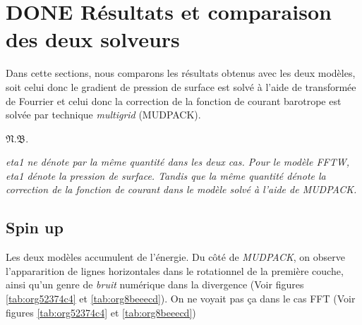 \documentclass[10pt]{article}
\numberwithin{equation}{section}
\newcommand{\pt}{\hspace{1pt}} %
\newcommand{\nb}{\underline{{\footnotesize\EightStarConvex}\pt $\mathfrak{N.B.}$\vphantom{p}}\hspace{3pt}}
\begin{document}
\section{{\bfseries\sffamily DONE} Résultats et comparaison des deux solveurs}
\label{sec:orgddf1f3c}
Dans cette sections, nous comparons les résultats obtenus avec les deux modèles, soit celui donc le gradient de pression de surface est solvé à l'aide de transformée de Fourrier et celui donc la correction de la fonction de courant barotrope est solvée par technique \emph{multigrid} (MUDPACK).\bigskip

\nb\begin{minipage}[t]{0.9\linewidth}
\itshape 
eta1 ne dénote par la même quantité dans les deux cas.
Pour le modèle FFTW, eta1 dénote la pression de surface.
Tandis que la même quantité dénote la correction de la fonction de courant dans le modèle solvé à l'aide de MUDPACK.   
\end{minipage}
\newpage
\subsection{Spin up}
\label{sec:org12ce714}
Les deux modèles accumulent de l'énergie.
Du côté de \emph{MUDPACK}, on observe l'appararition de lignes horizontales dans le rotationnel de la première couche, ainsi qu'un genre de \emph{bruit} numérique dans la divergence (Voir figures \ref{tab:org52374c4} et \ref{tab:org8beeecd}).
On ne voyait pas ça dans le cas FFT (Voir figures \ref{tab:org52374c4} et \ref{tab:org8beeecd})
\end{document}
